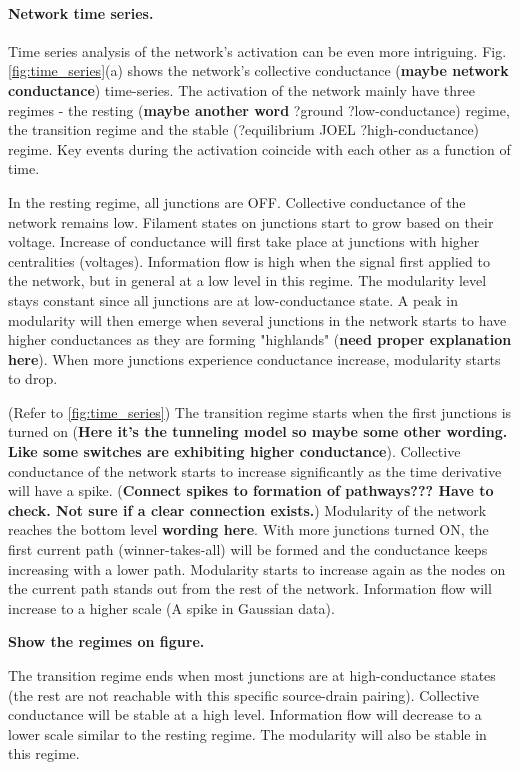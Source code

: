 \documentclass[fleqn,10pt,  amsmath,amssymb,aps]{wlscirep}
\begin{document}
\paragraph{Network time series.}
Time series analysis of the network's activation can be even more intriguing. Fig. \ref{fig:time_series}(a) shows the network's collective conductance (\textbf{maybe network conductance}) time-series. The activation of the network mainly have three regimes - the resting (\textbf{maybe another word} ?ground ?low-conductance) regime, the transition regime and the stable (?equilibrium JOEL ?high-conductance) regime. Key events during the activation coincide with each other as a function of time. 

In the resting regime, all junctions are OFF. Collective conductance of the network remains low. Filament states on junctions start to grow based on their voltage. Increase of conductance will first take place at junctions with higher centralities (voltages). Information flow is high when the signal first applied to the network, but in general at a low level in this regime. The modularity level stays constant since all junctions are at low-conductance state. A peak in modularity will then emerge when several junctions in the network starts to have higher conductances as they are forming "highlands" (\textbf{need proper explanation here}). When more junctions experience conductance increase, modularity starts to drop.

(Refer to \ref{fig:time_series}) The transition regime starts when the first junctions is turned on (\textbf{Here it's the tunneling model so maybe some other wording. Like some switches are exhibiting higher conductance}). Collective conductance of the network starts to increase significantly as the time derivative will have a spike. (\textbf{Connect spikes to formation of pathways??? Have to check. Not sure if a clear connection exists.}) Modularity of the network reaches the bottom level \textbf{wording here}. With more junctions turned ON, the first current path (winner-takes-all) will be formed and the conductance keeps increasing with a lower path. Modularity starts to increase again as the nodes on the current path stands out from the rest of the network. Information flow will increase to a higher scale (A spike in Gaussian data). 

\textbf{Show the regimes on figure.}

The transition regime ends when most junctions are at high-conductance states (the rest are not reachable with this specific source-drain pairing). Collective conductance will be stable at a high level. Information flow will decrease to a lower scale similar to the resting regime. The modularity will also be stable in this regime.
\end{document}
